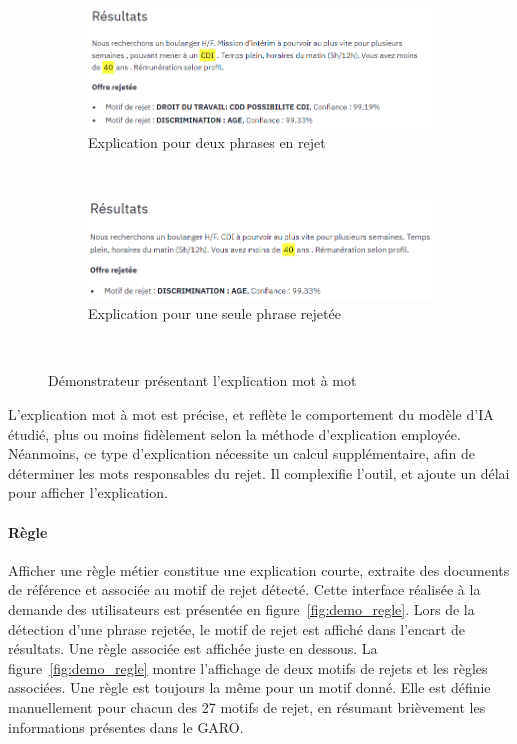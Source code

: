 \begin{figure}[htpb!]
    \centering
    \begin{subfigure}[b]{0.48\textwidth}
        \centering \includegraphics[width=\textwidth]{S2-Explicabilite_locale/figures/demo_mot.png}
        \caption{Explication pour deux phrases en rejet}
        \label{fig:demo_mot_1}
    \end{subfigure}
    ~
    \begin{subfigure}[b]{0.48\textwidth}
        \centering \includegraphics[width=\textwidth]{S2-Explicabilite_locale/figures/demo_mot_2.png}
        \caption{Explication pour une seule phrase rejetée}
        \label{fig:demo_mot_2}
    \end{subfigure}
    ~
    \caption{Démonstrateur présentant l'explication mot à mot
 }\label{fig:demo_mot}
\end{figure}

L'explication mot à mot est précise, et reflète le comportement du modèle d'IA étudié, plus ou moins fidèlement selon la méthode d'explication employée.
Néanmoins, ce type d'explication nécessite un calcul supplémentaire, afin de déterminer les mots responsables du rejet. Il complexifie l'outil, et ajoute un délai pour afficher l'explication.

\paragraph{Règle} Afficher une règle métier constitue une explication courte, extraite des documents de référence et associée au motif de rejet détecté. Cette interface réalisée à la demande des utilisateurs est présentée en figure~\ref{fig:demo_regle}.
Lors de la détection d'une phrase rejetée, le motif de rejet est affiché dans l'encart de résultats. Une règle associée est affichée juste en dessous. La figure~\ref{fig:demo_regle} montre l'affichage de deux motifs de rejets et les règles associées. Une règle est toujours la même pour un motif donné. Elle est définie manuellement pour chacun des 27 motifs de rejet, en résumant brièvement les informations présentes dans le GARO.

